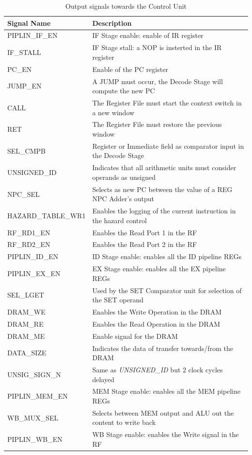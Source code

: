 \begin{table}[H]
    \centering
    \begin{tabular}{l|l}
        \textbf{Signal Name} & \textbf{Description}\\
        \hline
        PIPLIN\_IF\_EN & IF Stage enable: enable of IR register \\
        IF\_STALL & IF Stage stall: a NOP is insterted in the IR register \\
        PC\_EN & Enable of the PC register \\
        JUMP\_EN & A JUMP must occur, the Decode Stage will compute the new PC \\
        CALL & The Register File must start the context switch in a new window\\
        RET & The Register File must restore the previous window\\
        SEL\_CMPB & Register or Immediate field as comparator input in the Decode Stage\\
        UNSIGNED\_ID & Indicates that all arithmetic units must consider operands as unsigned\\
        NPC\_SEL & Selects as new PC between the value of a REG NPC Adder's output\\
        HAZARD\_TABLE\_WR1 & Enables the logging of the current instruction in the hazard control\\
        RF\_RD1\_EN & Enables the Read Port 1 in the RF\\
        RF\_RD2\_EN & Enables the Read Port 2 in the RF\\
        PIPLIN\_ID\_EN & ID Stage enable: enables all the ID pipeline REGs\\
        PIPLIN\_EX\_EN & EX Stage enable: enables all the EX pipeline REGs\\
        SEL\_LGET & Used by the SET Comparator unit for selection of the SET operand\\
        DRAM\_WE & Enables the Write Operation in the DRAM\\
        DRAM\_RE & Enables the Read Operation in the DRAM\\
        DRAM\_ME & Enable signal for the DRAM\\
        DATA\_SIZE & Indicates the data of transfer towards/from the DRAM\\
        UNSIG\_SIGN\_N & Same as \emph{UNSIGNED\_ID} but 2 clock cycles delayed\\
        PIPLIN\_MEM\_EN & MEM Stage enable: enables all the MEM pipeline REGs\\
        WB\_MUX\_SEL & Selects between MEM output and ALU out the content to write back\\
        PIPLIN\_WB\_EN & WB Stage enable: enables the Write signal in the RF\\
    \end{tabular}
    \caption{Output signals towards the Control Unit}
    \label{table:cu:output_signals}
\end{table}

